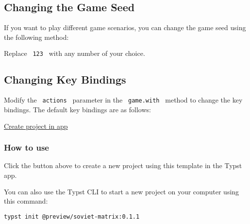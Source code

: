 \subsection{Changing the Game Seed}\label{changing-the-game-seed}

If you want to play different game scenarios, you can change the game
seed using the following method:

\begin{Shaded}
\begin{Highlighting}[]
\end{Highlighting}
\end{Shaded}

Replace \texttt{\ 123\ } with any number of your choice.

\subsection{Changing Key Bindings}\label{changing-key-bindings}

Modify the \texttt{\ actions\ } parameter in the \texttt{\ game.with\ }
method to change the key bindings. The default key bindings are as
follows:

\begin{Shaded}
\begin{Highlighting}[]
\NormalTok{))}
\end{Highlighting}
\end{Shaded}

\href{/app?template=soviet-matrix&version=0.1.1}{Create project in app}

\subsubsection{How to use}\label{how-to-use}

Click the button above to create a new project using this template in
the Typst app.

You can also use the Typst CLI to start a new project on your computer
using this command:

\begin{verbatim}
typst init @preview/soviet-matrix:0.1.1
\end{verbatim}

